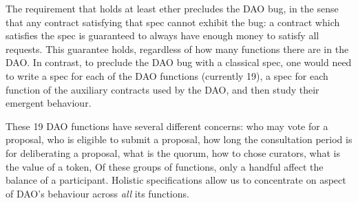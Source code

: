  

The requirement that  holds at least  ether precludes the DAO bug,
in the sense that  any contract satisfying that spec cannot exhibit  the  bug:   a contract
which satisfies the spec  is guaranteed to always have enough money to satisfy all  requests.
This guarantee  holds, regardless of how many functions there are in the DAO.
In contrast, to preclude the DAO  bug with a classical spec, one would need to write a spec for each of the
DAO functions (currently 19), a spec for each function of the auxiliary contracts used by the DAO,
and then study their emergent  behaviour.

These 19 DAO functions   have several different concerns:
who may vote   for a proposal, who is eligible to submit a proposal,
how long the consultation period is for deliberating a proposal, what
is the quorum, how to chose curators, what is the value of a token,
Of these groups of functions, only  a handful affect the balance of a
participant. Holistic specifications allow us to concentrate on aspect of DAO's behaviour across \emph{all} its functions.

